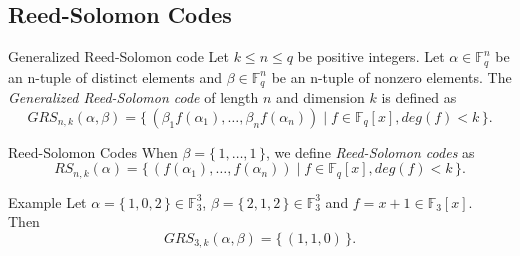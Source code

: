\subsection{Reed-Solomon Codes}
\begin{frame}

    \begin{block}{Generalized Reed-Solomon code}
        Let $k \leq n \leq q$ be positive integers. Let $\alpha \in \mathbb{F}_q^n$ be an n-tuple of distinct elements and $\beta \in \mathbb{F}_q^n$ be an n-tuple of nonzero elements. The \textit{Generalized Reed-Solomon code} of length $n$ and dimension $k$ is defined as
        \[
        GRS_{n,k}(\alpha, \beta) = \{\, (\beta_1f(\alpha_1), \dots, \beta_nf(\alpha_n)) \mid f \in \mathbb{F}_q[x], deg(f) < k \,\}.
        \]
    \end{block}

    \begin{block}{Reed-Solomon Codes}
        When $\beta = \{\,1, \dots,1 \,\}$, we define \textit{Reed-Solomon codes} as
        \[
        RS_{n,k}(\alpha) = \{\, (f(\alpha_1), \dots, f(\alpha_n)) \mid f \in \mathbb{F}_q[x], deg(f) < k \,\}.
        \]
    \end{block}

    \begin{exampleblock}{Example}
        Let $\alpha = \{\,1,0,2\,\} \in \mathbb{F}_3^3$, $\beta = \{\,2,1,2 \,\} \in \mathbb{F}_3^3$ and $f = x+1 \in \mathbb{F}_3[x]$.\\
        Then
        \[
            GRS_{3,k}(\alpha, \beta) = \{\, (1,1,0)\,\}.
        \]
    \end{exampleblock}
    
\end{frame}

